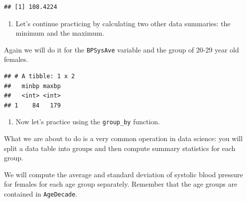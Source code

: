 \documentclass[
]{article}
\newenvironment{Shaded}{\begin{snugshade}}{\end{snugshade}}
\newcommand{\CommentTok}[1]{\textcolor[rgb]{0.56,0.35,0.01}{\textit{#1}}}
\newcommand{\DataTypeTok}[1]{\textcolor[rgb]{0.13,0.29,0.53}{#1}}
\newcommand{\KeywordTok}[1]{\textcolor[rgb]{0.13,0.29,0.53}{\textbf{#1}}}
\newcommand{\NormalTok}[1]{#1}
\newcommand{\OperatorTok}[1]{\textcolor[rgb]{0.81,0.36,0.00}{\textbf{#1}}}
\newcommand{\OtherTok}[1]{\textcolor[rgb]{0.56,0.35,0.01}{#1}}
\newcommand{\StringTok}[1]{\textcolor[rgb]{0.31,0.60,0.02}{#1}}
\providecommand{\tightlist}{%
  \setlength{\itemsep}{0pt}\setlength{\parskip}{0pt}}
\begin{document}
\begin{verbatim}
## [1] 108.4224
\end{verbatim}

\begin{enumerate}
\def\labelenumi{\arabic{enumi}.}
\setcounter{enumi}{3}
\tightlist
\item
  Let's continue practicing by calculating two other data summaries: the
  minimum and the maximum.
\end{enumerate}

Again we will do it for the \texttt{BPSysAve} variable and the group of
20-29 year old females.

\begin{Shaded}
\end{Shaded}

\begin{verbatim}
## # A tibble: 1 x 2
##   minbp maxbp
##   <int> <int>
## 1    84   179
\end{verbatim}

\begin{enumerate}
\def\labelenumi{\arabic{enumi}.}
\setcounter{enumi}{4}
\tightlist
\item
  Now let's practice using the \texttt{group\_by} function.
\end{enumerate}

What we are about to do is a very common operation in data science: you
will split a data table into groups and then compute summary statistics
for each group.

We will compute the average and standard deviation of systolic blood
pressure for females for each age group separately. Remember that the
age groups are contained in \texttt{AgeDecade}.

\begin{Shaded}
\end{Shaded}
\end{document}
